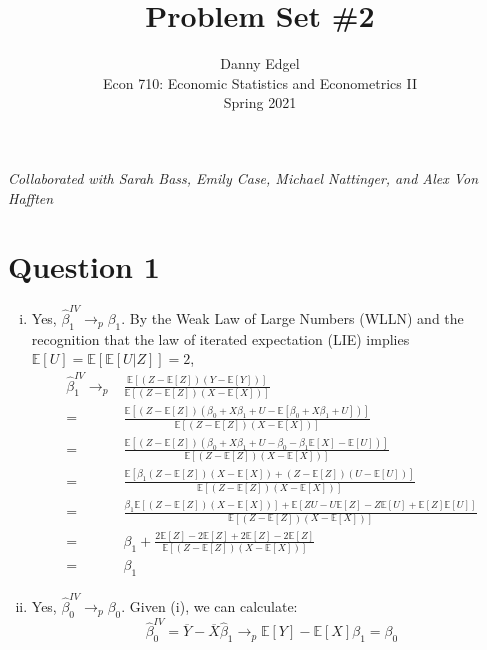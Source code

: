 \documentclass{article}
\newcommand{\bhat}{\hat{\beta}}
\newcommand{\biv}{\bhat^{IV}}
\newcommand{\xbar}{\overline{X}}
\newcommand{\ybar}{\overline{Y}}
\newcommand{\E}[1]{\mathbb{E}\left[#1\right]}%
\begin{document}
\title{	Problem Set \#2 }
\author{ 	Danny Edgel 										\\ 
			Econ 710: Economic Statistics and Econometrics II	\\
			Spring 2021											\\
		}
\maketitle\thispagestyle{empty}


\noindent\textit{Collaborated with Sarah Bass, Emily Case, Michael Nattinger, and Alex Von Hafften}


\section*{Question 1}

\begin{enumerate}[(i)]
	\item Yes, ${\biv_1\rightarrow_p\beta_1}$. By the Weak Law of Large Numbers (WLLN) and the recognition that the law of iterated expectation (LIE) implies ${\E{U}=\E{\E{U|Z}}=2}$,
		\begin{align*}
			\biv_1 \rightarrow_p	  &\frac{\E{(Z-\E{Z})(Y-\E{Y})}}{\E{(Z-\E{Z})(X-\E{X})}}													\\
									= &\frac{\E{(Z-\E{Z})(\beta_0 + X\beta_1 + U-\E{\beta_0 + X\beta_1 + U})}}{\E{(Z-\E{Z})(X-\E{X})}}			\\
									= &\frac{\E{(Z-\E{Z})(\beta_0 + X\beta_1 + U-\beta_0 - \beta_1\E{X} - \E{U})}}{\E{(Z-\E{Z})(X-\E{X})}}		\\
									= &\frac{\E{\beta_1(Z-\E{Z})(X - \E{X}) + (Z-\E{Z})(U - \E{U})}}{\E{(Z-\E{Z})(X-\E{X})}}					\\
									= &\frac{\beta_1\E{(Z-\E{Z})(X - \E{X})} + \E{ZU - U\E{Z} - Z\E{U} + \E{Z}\E{U}}}{\E{(Z-\E{Z})(X-\E{X})}}	\\
									= &\beta_1 + \frac{2\E{Z}-2\E{Z}+2\E{Z}-2\E{Z}}{\E{(Z-\E{Z})(X-\E{X})}}										\\
									= &\beta_1
		\end{align*}
	
	\item Yes, ${\biv_0\rightarrow_p\beta_0}$. Given (i), we can calculate:
		\[
			\biv_0 = \ybar - \xbar\bhat_1 \rightarrow_p \E{Y} - \E{X}\beta_1 = \beta_0
		\]
	
\end{enumerate}
\end{document}
